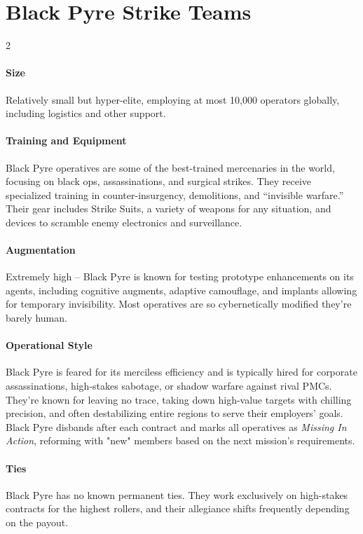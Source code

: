 \section*{Black Pyre Strike Teams}
\vspace{5mm}
\begin{multicols}{2}
\paragraph{Size}
Relatively small but hyper-elite, employing at most 10,000 operators globally, including logistics and other support. 
\paragraph{Training and Equipment}
Black Pyre operatives are some of the best-trained mercenaries in the world, focusing on black ops, assassinations, and surgical strikes. They receive specialized training in counter-insurgency, demolitions, and “invisible warfare.” Their gear includes Strike Suits, a variety of weapons for any situation, and devices to scramble enemy electronics and surveillance.
\paragraph{Augmentation}
Extremely high – Black Pyre is known for testing prototype enhancements on its agents, including cognitive augments, adaptive camouflage, and implants allowing for temporary invisibility. Most operatives are so cybernetically modified they’re barely human.
\paragraph{Operational Style}
Black Pyre is feared for its merciless efficiency
	and is typically hired for corporate assassinations,
	high-stakes sabotage,
	or shadow warfare against rival PMCs.
They’re known for leaving no trace,
	taking down high-value targets with chilling precision,
	and often destabilizing entire regions to serve their employers’ goals.
Black Pyre disbands after each contract
	and marks all operatives as \emph{Missing In Action},
	reforming with "new" members based on the next mission’s requirements.
\paragraph{Ties}
Black Pyre has no known permanent ties.
They work exclusively on high-stakes contracts for the highest rollers, and their allegiance shifts frequently depending on the payout.

\end{multicols}

